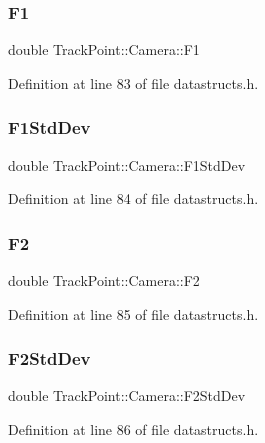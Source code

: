 \subsubsection{\texorpdfstring{F1}{F1}}
{\footnotesize\ttfamily double Track\+Point\+::\+Camera\+::\+F1}



Definition at line 83 of file datastructs.\+h.

\mbox{\label{struct_track_point_1_1_camera_aec794003aed61dc7c85006f2372e39fe}} 
\subsubsection{\texorpdfstring{F1StdDev}{F1StdDev}}
{\footnotesize\ttfamily double Track\+Point\+::\+Camera\+::\+F1\+Std\+Dev}



Definition at line 84 of file datastructs.\+h.

\mbox{\label{struct_track_point_1_1_camera_a0a1cc2e3a79d9a606a0e5728ba6b1188}} 
\subsubsection{\texorpdfstring{F2}{F2}}
{\footnotesize\ttfamily double Track\+Point\+::\+Camera\+::\+F2}



Definition at line 85 of file datastructs.\+h.

\mbox{\label{struct_track_point_1_1_camera_ac5a5d87d4ba200e24979b2670c435c9c}} 
\subsubsection{\texorpdfstring{F2StdDev}{F2StdDev}}
{\footnotesize\ttfamily double Track\+Point\+::\+Camera\+::\+F2\+Std\+Dev}



Definition at line 86 of file datastructs.\+h.


